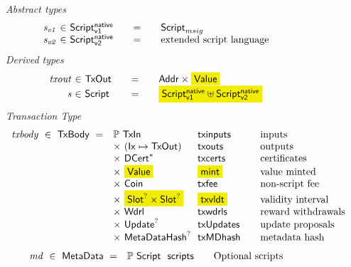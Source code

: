 \begin{figure*}[t!]
  \emph{Abstract types}
  \begin{equation*}
    \begin{array}{r@{~\in~}l@{\qquad=\qquad}lr}
      \var{s_{v1}} & \ScriptNI & \ScriptMSig \\
      \var{s_{v2}} & \ScriptMPS & \text{extended script language}
    \end{array}
  \end{equation*}
  \emph{Derived types}
  \begin{equation*}
    \begin{array}{r@{~\in~}l@{\qquad=\qquad}lr}
      \var{txout} & \TxOut & \Addr \times \hldiff{\Value} \\
      \var{s} & \Script & \hldiff{\ScriptNI \uniondistinct \ScriptMPS}
      \\
    \end{array}
  \end{equation*}
  \emph{Transaction Type}
  \begin{equation*}
    \begin{array}{r@{~~}l@{~~}l@{\qquad}l}
      \var{txbody} ~\in~ \TxBody ~=~
      & \powerset{\TxIn} & \fun{txinputs}& \text{inputs}\\
      &\times ~(\Ix \mapsto \TxOut) & \fun{txouts}& \text{outputs}\\
      & \times~ \seqof{\DCert} & \fun{txcerts}& \text{certificates}\\
       & \times ~\hldiff{\Value}  & \hldiff{\fun{mint}} &\text{value minted}\\
       & \times ~\Coin & \fun{txfee} &\text{non-script fee}\\
       & \times ~\hldiff{\Slot^? \times \Slot^?} & \hldiff{\fun{txvldt}} & \text{validity interval}\\
       & \times~ \Wdrl  & \fun{txwdrls} &\text{reward withdrawals}\\
       & \times ~\Update^?  & \fun{txUpdates} & \text{update proposals}\\
       & \times ~\MetaDataHash^? & \fun{txMDhash} & \text{metadata hash}
    \end{array}
  \end{equation*}
  \begin{equation*}
    \begin{array}{r@{~~}l@{~~}l@{\qquad}l}
      \var{md} ~\in~ \MetaData ~=~
      & \powerset{\Script} & \fun{scripts}& \text{Optional scripts}\\

\end{array}
\end{equation*}
\end{figure*}
